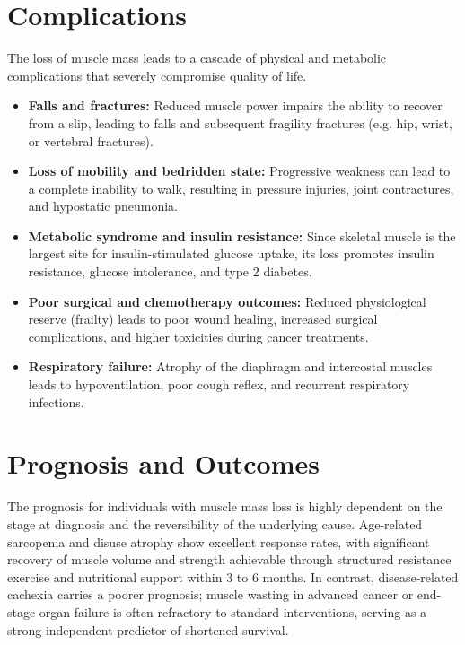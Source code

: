 \section*{Complications}
The loss of muscle mass leads to a cascade of physical and metabolic complications that severely compromise quality of life.
\begin{itemize}
    \item \textbf{Falls and fractures:} Reduced muscle power impairs the ability to recover from a slip, leading to falls and subsequent fragility fractures (e.g. hip, wrist, or vertebral fractures).
    \item \textbf{Loss of mobility and bedridden state:} Progressive weakness can lead to a complete inability to walk, resulting in pressure injuries, joint contractures, and hypostatic pneumonia.
    \item \textbf{Metabolic syndrome and insulin resistance:} Since skeletal muscle is the largest site for insulin-stimulated glucose uptake, its loss promotes insulin resistance, glucose intolerance, and type 2 diabetes.
    \item \textbf{Poor surgical and chemotherapy outcomes:} Reduced physiological reserve (frailty) leads to poor wound healing, increased surgical complications, and higher toxicities during cancer treatments.
    \item \textbf{Respiratory failure:} Atrophy of the diaphragm and intercostal muscles leads to hypoventilation, poor cough reflex, and recurrent respiratory infections.
\end{itemize}

\section*{Prognosis and Outcomes}
The prognosis for individuals with muscle mass loss is highly dependent on the stage at diagnosis and the reversibility of the underlying cause. Age-related sarcopenia and disuse atrophy show excellent response rates, with significant recovery of muscle volume and strength achievable through structured resistance exercise and nutritional support within 3 to 6 months. In contrast, disease-related cachexia carries a poorer prognosis; muscle wasting in advanced cancer or end-stage organ failure is often refractory to standard interventions, serving as a strong independent predictor of shortened survival.

